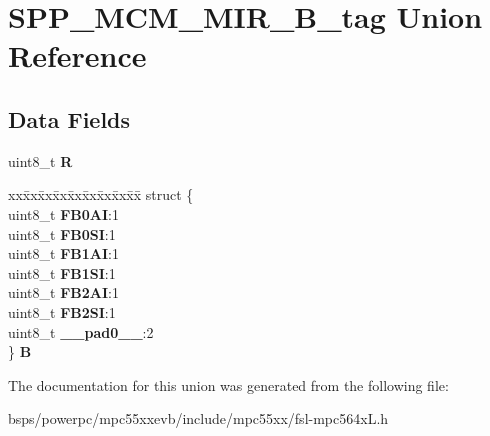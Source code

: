 \hypertarget{unionSPP__MCM__MIR__8B__tag}{}\section{S\+P\+P\+\_\+\+M\+C\+M\+\_\+\+M\+I\+R\+\_\+B\+\_\+tag Union Reference}
\label{unionSPP__MCM__MIR__8B__tag}
\subsection*{Data Fields}
\begin{DoxyCompactItemize}
\item 
\mbox{\label{unionSPP__MCM__MIR__8B__tag_a2103f2fe3b6e183618a41f5961587e55}} 
uint8\+\_\+t {\bfseries R}
\item 
\mbox{\label{unionSPP__MCM__MIR__8B__tag_ae510e8136887a74a35edda8c8194fd2e}} 
\begin{tabbing}
xx\=xx\=xx\=xx\=xx\=xx\=xx\=xx\=xx\=\kill
struct \{\\
\>uint8\_t {\bfseries FB0AI}:1\\
\>uint8\_t {\bfseries FB0SI}:1\\
\>uint8\_t {\bfseries FB1AI}:1\\
\>uint8\_t {\bfseries FB1SI}:1\\
\>uint8\_t {\bfseries FB2AI}:1\\
\>uint8\_t {\bfseries FB2SI}:1\\
\>uint8\_t {\bfseries \_\_pad0\_\_}:2\\
\} {\bfseries B}\\

\end{tabbing}\end{DoxyCompactItemize}


The documentation for this union was generated from the following file\+:\begin{DoxyCompactItemize}
\item 
bsps/powerpc/mpc55xxevb/include/mpc55xx/fsl-\/mpc564x\+L.\+h\end{DoxyCompactItemize}
